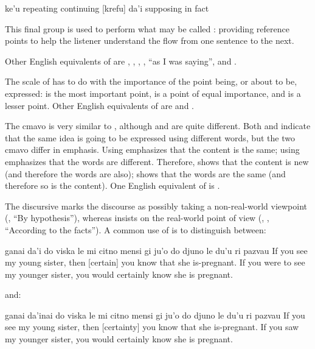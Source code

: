 ke'u    repeating           continuing
            [krefu]
    da'i    supposing           in fact

This final group is used to perform what may be called
    : providing reference points to help
    the listener understand the flow from one sentence to the next.

Other English equivalents of  are ,
    , , , ``as I was
    saying'', and .

The scale of  has to do with the importance of the
    point being, or about to be, expressed:  is the most
    important point,  is a point of equal importance,
    and  is a lesser point. Other English equivalents of
     are  and .

The cmavo  is very similar to , although
     and  are quite different. Both 
    and  indicate that the same idea is going to be
    expressed using different words, but the two cmavo differ in
    emphasis. Using  emphasizes that the content is the
    same; using  emphasizes that the words are different.
    Therefore,  shows that the content is new (and
    therefore the words are also);  shows that the words
    are the same (and therefore so is the content). One English
    equivalent of  is .

The discursive  marks the discourse as possibly
    taking a non-real-world viewpoint (, ``By
    hypothesis''), whereas  insists on the real-world
    point of view (, , ``According to the
    facts''). A common use of  is to distinguish
    between:
\begin{example}
\T	ganai da'i do viska le mi citno mensi\n
\T	gi ju'o do djuno le du'u ri pazvau\n
If you  see my young sister,\n
\T	then [certain] you know that she is-pregnant.\n
If you were to see my younger sister,\n
\T	you would certainly know she is pregnant.
\end{example}

{\noindent}and:
\begin{example}
\T	ganai da'inai do viska le mi citno mensi\n
\T	gi ju'o do djuno le du'u ri pazvau\n
If you  see my young sister,\n
\T	then [certainty] you know that she is-pregnant.\n
If you saw my younger sister,\n
\T	you would certainly know she is pregnant.
\end{example}

